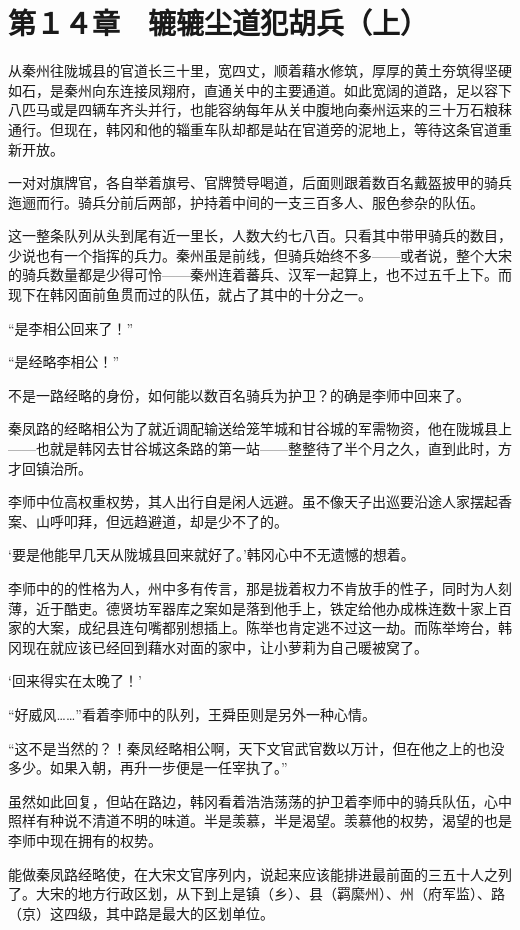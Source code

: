 \section{第１４章　辘辘尘道犯胡兵（上）}

从秦州往陇城县的官道长三十里，宽四丈，顺着藉水修筑，厚厚的黄土夯筑得坚硬如石，是秦州向东连接凤翔府，直通关中的主要通道。如此宽阔的道路，足以容下八匹马或是四辆车齐头并行，也能容纳每年从关中腹地向秦州运来的三十万石粮秣通行。但现在，韩冈和他的辎重车队却都是站在官道旁的泥地上，等待这条官道重新开放。

一对对旗牌官，各自举着旗号、官牌赞导喝道，后面则跟着数百名戴盔披甲的骑兵迤逦而行。骑兵分前后两部，护持着中间的一支三百多人、服色参杂的队伍。

这一整条队列从头到尾有近一里长，人数大约七八百。只看其中带甲骑兵的数目，少说也有一个指挥的兵力。秦州虽是前线，但骑兵始终不多——或者说，整个大宋的骑兵数量都是少得可怜——秦州连着蕃兵、汉军一起算上，也不过五千上下。而现下在韩冈面前鱼贯而过的队伍，就占了其中的十分之一。

“是李相公回来了！”

“是经略李相公！”

不是一路经略的身份，如何能以数百名骑兵为护卫？的确是李师中回来了。

秦凤路的经略相公为了就近调配输送给笼竿城和甘谷城的军需物资，他在陇城县上——也就是韩冈去甘谷城这条路的第一站——整整待了半个月之久，直到此时，方才回镇治所。

李师中位高权重权势，其人出行自是闲人远避。虽不像天子出巡要沿途人家摆起香案、山呼叩拜，但远趋避道，却是少不了的。

‘要是他能早几天从陇城县回来就好了。’韩冈心中不无遗憾的想着。

李师中的的性格为人，州中多有传言，那是拢着权力不肯放手的性子，同时为人刻薄，近于酷吏。德贤坊军器库之案如是落到他手上，铁定给他办成株连数十家上百家的大案，成纪县连句嘴都别想插上。陈举也肯定逃不过这一劫。而陈举垮台，韩冈现在就应该已经回到藉水对面的家中，让小萝莉为自己暖被窝了。

‘回来得实在太晚了！’

“好威风……”看着李师中的队列，王舜臣则是另外一种心情。

“这不是当然的？！秦凤经略相公啊，天下文官武官数以万计，但在他之上的也没多少。如果入朝，再升一步便是一任宰执了。”

虽然如此回复，但站在路边，韩冈看着浩浩荡荡的护卫着李师中的骑兵队伍，心中照样有种说不清道不明的味道。半是羡慕，半是渴望。羡慕他的权势，渴望的也是李师中现在拥有的权势。

能做秦凤路经略使，在大宋文官序列内，说起来应该能排进最前面的三五十人之列了。大宋的地方行政区划，从下到上是镇（乡）、县（羁縻州）、州（府军监）、路（京）这四级，其中路是最大的区划单位。

